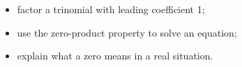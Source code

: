 \begin{learningtargetbox}
\begin{itemize}
  \item factor a trinomial with leading coefficient 1;
  \item use the zero-product property to solve an equation;
  \item explain what a zero means in a real situation.
\end{itemize}
\end{learningtargetbox}
